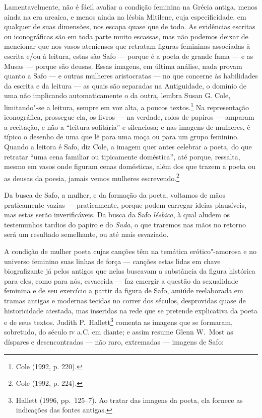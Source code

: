 Lamentavelmente, não é fácil avaliar a condição feminina na Grécia
antiga, menos ainda na era arcaica, e menos ainda na lésbia Mitilene, cuja
especificidade, em qualquer de suas dimensões, nos escapa quase que
de todo. As evidências escritas ou iconográficas são em toda parte muito
escassas, mas não podemos deixar de mencionar que nos vasos atenienses que
retratam figuras femininas associadas à escrita e/ou à leitura, estas são Safo
--- porque é a poeta de grande fama --- e as Musas --- porque são deusas.
Essas imagens, em última análise, nada provam quanto a Safo --- e outras mulheres
aristocratas --- no que concerne às habilidades da escrita e da leitura --- as
quais são separadas na Antiguidade, o domínio de uma não implicando
automaticamente o da outra, lembra Susan G. Cole, limitando"-se a
leitura, sempre em voz alta, a poucos textos.\footnote{ Cole (1992, p. 220).} Na representação iconográfica,
prossegue ela, os livros --- na verdade, rolos de papiros --- amparam a
recitação, e não a “leitura solitária” e silenciosa; e nas imagens de mulheres,
é típico o desenho de uma que lê para uma moça ou para um grupo feminino.
Quando a leitora é Safo, diz Cole, a imagem quer antes celebrar a poeta, do que
retratar “uma cena familiar ou tipicamente doméstica”, até porque, ressalta,
mesmo em vasos onde figuram cenas domésticas, além dos que trazem a poeta ou as
deusas da poesia, jamais vemos mulheres escrevendo.\footnote{ Cole (1992, p. 224).}

Da busca de Safo, a mulher, e da formação da poeta, voltamos de mãos
praticamente vazias --- praticamente, porque podem carregar ideias plausíveis,
mas estas serão inverificáveis. Da busca da Safo \textit{lésbica}, à qual
aludem os testemunhos tardios do papiro e do \textit{Suda}, o que traremos nas
mãos no retorno será um resultado semelhante, ou até mais esvaziado.

A condição de mulher poeta cujas canções têm na temática erótico"-amorosa e no
universo feminino suas linhas de força --- canções estas lidas em chave
biografizante já pelos antigos que nelas buscavam a substância da figura
histórica para eles, como para nós, esvaecida --- faz emergir a questão da
sexualidade feminina e de seu exercício a partir da figura de Safo,
amiúde reelaborada em tramas antigas e modernas tecidas no correr dos
séculos, desprovidas quase de historicidade atestada, mas
inseridas na rede que se pretende explicativa da poeta e de seus textos. Judith
P.~Hallett\footnote{ Hallett (1996, pp.~125--7). Ao tratar das
imagens da poeta, ela fornece as indicações das fontes antigas.} comenta as
imagens que se formaram, sobretudo, do século \textsc{iv} a.C. em diante; e assim resume
Glenn W.~Most as díspares e desencontradas --- não raro,
extremadas --- imagens de Safo: 

